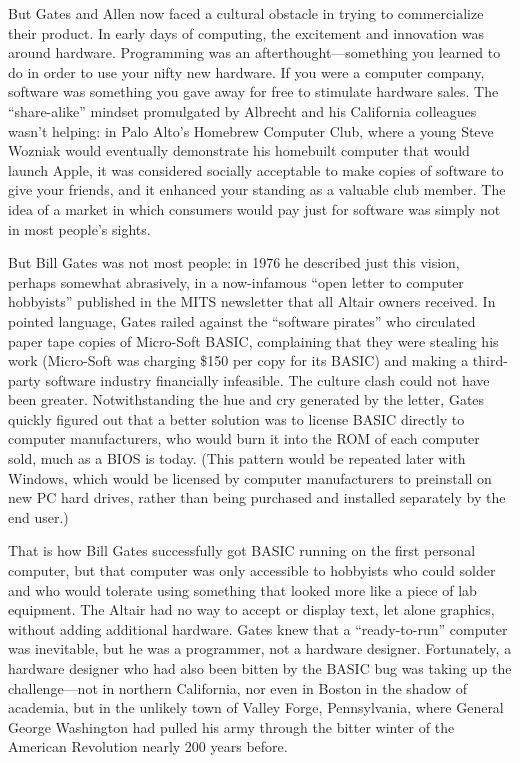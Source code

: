 But Gates and Allen now faced a cultural obstacle in trying to
commercialize their product.
In early days of computing, the excitement and innovation was around
hardware.
Programming was an afterthought---something you learned to do in order
to use your nifty new hardware.
If you were a computer company, software was something you gave away
for free to stimulate hardware sales.
The ``share-alike'' mindset promulgated by Albrecht and his California
colleagues wasn't helping: in Palo Alto's Homebrew Computer Club,
where a young Steve Wozniak would eventually demonstrate his homebuilt
computer that would launch Apple, it was considered socially
acceptable to make copies of software to give your friends, and it
enhanced your standing as a valuable club member.
The idea of a market in which consumers would pay just for software
was simply not in most people's sights.

But Bill Gates was not most people: in 1976 he described just this
vision, perhaps somewhat abrasively, in a now-infamous ``open letter
to computer hobbyists'' published in the MITS newsletter that all
Altair owners received.
In pointed language, Gates railed against the ``software pirates'' who
circulated paper tape copies of Micro-Soft BASIC, complaining that
they were stealing his work (Micro-Soft was charging \$150 per copy
for its BASIC) and making a third-party software industry financially
infeasible.
The culture clash could not have been greater.
Notwithstanding the hue and cry generated by the letter, Gates quickly
figured out that a better solution was to license BASIC directly to
computer manufacturers, who would burn it into the ROM of each
computer sold, much as a BIOS is today.
(This pattern would be repeated later with Windows, which would be
licensed by computer manufacturers to preinstall on new PC hard
drives, rather than being purchased and installed separately by the
end user.)

That is how Bill Gates successfully got BASIC running on the first
personal computer, but that computer was only accessible to hobbyists
who could solder and who would tolerate using something that looked
more like a piece of lab equipment.
The Altair had no way to accept or display text, let alone graphics,
without adding additional hardware.
Gates knew that a ``ready-to-run'' computer was inevitable, but he was
a programmer, not a hardware designer.
Fortunately, a hardware designer who had also been bitten by the BASIC
bug was taking up the challenge---not in northern California, nor even
in Boston in the shadow of academia, but in the unlikely town of
Valley Forge, Pennsylvania, where General George Washington had pulled
his army through the bitter winter of the American Revolution nearly
200 years before.



